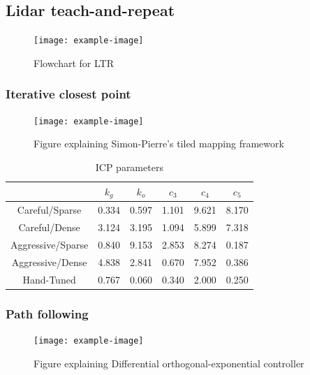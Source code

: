 \subsection{Lidar teach-and-repeat}
\label{sec:LTR}
\lightlipsum[1]

\begin{figure} [htpb]
	\centering
	\texttt{[image: example-image]}
	\caption{Flowchart for LTR}
	\label{fig:ltr_flow}
\end{figure}

\subsubsection{Iterative closest point}
\label{ICP}

\lightlipsum[1]

\begin{figure} [htpb]
	\centering
	\texttt{[image: example-image]}
	\caption{Figure explaining Simon-Pierre's tiled mapping framework}
	\label{fig:tiled_map}
\end{figure}

\begin{table}[htpb]
	\caption{\ac{ICP} parameters} \label{tab:LTR-runs}
	\begin{center}
		\begin{tabular}{|c|c|c|c|c|c|}
			\hline
			& $k_{g}$ & $k_{o}$ & $c_{3}$ & $c_{4}$ & $c_{5}$ \\
			\hline\hline
			Careful/Sparse & 0.334 & 0.597 & 1.101 & 9.621 & 8.170 \\ \hline
			Careful/Dense & 3.124 & 3.195 & 1.094 & 5.899 & 7.318 \\ \hline
			Aggressive/Sparse & 0.840 & 9.153 & 2.853 & 8.274 & 0.187 \\ \hline
			Aggressive/Dense & 4.838 & 2.841 & 0.670 & 7.952 & 0.386 \\ \hline
			Hand-Tuned & 0.767 & 0.060 & 0.340 & 2.000 & 0.250 \\
			\hline
		\end{tabular}
	\end{center}
\end{table}

\subsubsection{Path following}
\label{sec:orthexp}

\lightlipsum[1]

\begin{figure} [htpb]
	\centering
	\texttt{[image: example-image]}
	\caption{Figure explaining Differential orthogonal-exponential controller}
	\label{fig:diff_orthexp}
\end{figure}